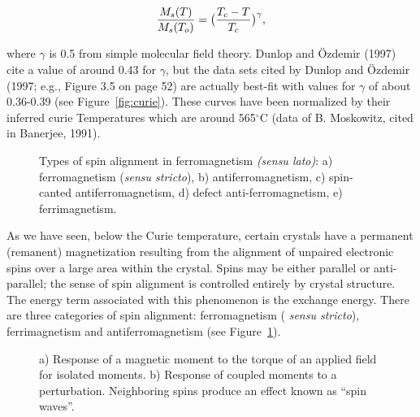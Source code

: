 \begin{equation}
{M_s(T)\over {M_s(T_o)}} = \bigl({  {T_c - T}\over{T_c}} \bigr)^{\gamma },
\label{eq:MsT}
\end{equation}

\noindent  where  $\gamma$ is 0.5 from simple molecular field theory.   Dunlop and \"Ozdemir (1997) cite a value of around 0.43 for $\gamma$, but the  data sets cited by Dunlop and \"Ozdemir (1997; e.g., Figure 3.5 on page 52) are actually best-fit with values for $\gamma$ of about 0.36-0.39 (see Figure~\ref{fig:curie}).   These curves have been normalized by their inferred curie Temperatures which are around 565$^{\circ}$C (data of B. Moskowitz, cited in
 Banerjee, 1991).  \nocite{banerjee91} 

\begin{figure}[h!tb]
\epsfxsize 15cm
\centering {}
\caption{Types of spin alignment in ferromagnetism {\it (sensu lato)}:
a) ferromagnetism ({\it sensu stricto}), b) antiferromagnetism, c)
spin-canted antiferromagnetism, d) defect anti-ferromagnetism, e)
ferrimagnetism.
}
\label{fig:spins}
\end{figure}



%

As we have seen,
below the Curie temperature, certain crystals have a permanent
(remanent) magnetization resulting from the alignment of unpaired
electronic spins over a large area within the crystal.  Spins may be
 either parallel or anti-parallel;
the sense of spin alignment is controlled
entirely by crystal structure. The energy term associated with this
phenomenon is the 
%
{exchange energy}. 
%
%
%
 There are three categories of spin alignment: ferromagnetism ({\it
sensu stricto}),  ferrimagnetism and antiferromagnetism (see
Figure~\ref{fig:spins}).  

 \begin{figure}[htb]
 \epsfxsize 15cm
 \centering {}
 \caption{a) Response of a magnetic moment to the torque of an applied field for isolated moments.  b) Response of coupled moments to a perturbation. Neighboring spins produce an effect known as ``spin waves''.}
 \label{fig:spinwave}
 \end{figure}
 


